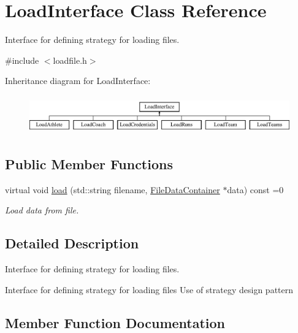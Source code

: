 \hypertarget{classLoadInterface}{}\section{Load\+Interface Class Reference}
\label{classLoadInterface}


Interface for defining strategy for loading files.  




{\ttfamily \#include $<$loadfile.\+h$>$}

Inheritance diagram for Load\+Interface\+:\begin{figure}[H]
\begin{center}
\leavevmode
\includegraphics[height=1.666667cm]{classLoadInterface}
\end{center}
\end{figure}
\subsection*{Public Member Functions}
\begin{DoxyCompactItemize}
\item 
virtual void \mbox{\hyperlink{classLoadInterface_a91bdc01550e64219c4007afce054fd40}{load}} (std\+::string filename, \mbox{\hyperlink{classFileDataContainer}{File\+Data\+Container}} $\ast$data) const =0
\begin{DoxyCompactList}\small\item\em Load data from file. \end{DoxyCompactList}\end{DoxyCompactItemize}


\subsection{Detailed Description}
Interface for defining strategy for loading files. 

Interface for defining strategy for loading files Use of strategy design pattern 

\subsection{Member Function Documentation}
\mbox{\label{classLoadInterface_a91bdc01550e64219c4007afce054fd40}} 
